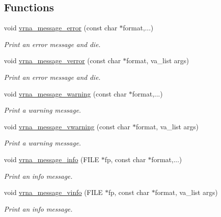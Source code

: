 \subsection*{Functions}
\begin{DoxyCompactItemize}
\item 
void \hyperlink{group__message__utils_ga36b35be01d7f36cf7f59c245eee628d1}{vrna\+\_\+message\+\_\+error} (const char $\ast$format,...)
\begin{DoxyCompactList}\small\item\em Print an error message and die. \end{DoxyCompactList}\item 
void \hyperlink{group__message__utils_gabc1a08dea0d84b5c33701732172a8b18}{vrna\+\_\+message\+\_\+verror} (const char $\ast$format, va\+\_\+list args)
\begin{DoxyCompactList}\small\item\em Print an error message and die. \end{DoxyCompactList}\item 
void \hyperlink{group__message__utils_ga6e07ed24add60693ba886d54d0a46635}{vrna\+\_\+message\+\_\+warning} (const char $\ast$format,...)
\begin{DoxyCompactList}\small\item\em Print a warning message. \end{DoxyCompactList}\item 
void \hyperlink{group__message__utils_ga377aa8ec8a49d343063adb22e6311f26}{vrna\+\_\+message\+\_\+vwarning} (const char $\ast$format, va\+\_\+list args)
\begin{DoxyCompactList}\small\item\em Print a warning message. \end{DoxyCompactList}\item 
void \hyperlink{group__message__utils_ga039bae6153a6415b054dbe6045f83d03}{vrna\+\_\+message\+\_\+info} (F\+I\+LE $\ast$fp, const char $\ast$format,...)
\begin{DoxyCompactList}\small\item\em Print an info message. \end{DoxyCompactList}\item 
void \hyperlink{group__message__utils_gad8b8139bd04fbfb51e398e9fcd6908dc}{vrna\+\_\+message\+\_\+vinfo} (F\+I\+LE $\ast$fp, const char $\ast$format, va\+\_\+list args)
\begin{DoxyCompactList}\small\item\em Print an info message. \end{DoxyCompactList}\item 

\end{DoxyCompactItemize}
